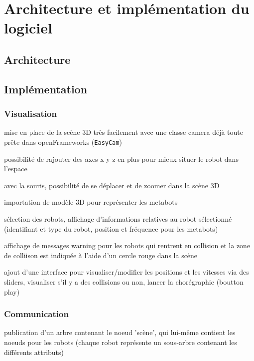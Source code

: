 \section{Architecture et implémentation du logiciel}

\subsection{Architecture}

\subsection{Implémentation}

\subsubsection{Visualisation}

mise en place de la scène 3D très facilement avec une classe camera déjà toute prête dans openFrameworks (\verb|EasyCam|)

possibilité de rajouter des axes x y z en plus pour mieux situer le robot dans l'espace

avec la souris, possibilité de se déplacer et de zoomer dans la scène 3D 

importation de modèle 3D pour représenter les metabots

sélection des robots, affichage d'informations relatives au robot sélectionné (identifiant et type du robot, position et fréquence pour les metabots)

affichage de messages warning pour les robots qui rentrent en collision et la zone de colliison est indiquée à l'aide d'un cercle rouge dans la scène

ajout d'une interface pour visualiser/modifier les positions et les vitesses via des sliders, visualiser s'il y a des collisions ou non, lancer la chorégraphie (boutton play)

\subsubsection{Communication}

publication d'un arbre contenant le noeud 'scène', qui lui-même contient les noeuds pour les robots (chaque robot représente un sous-arbre contenant les différents attributs)

